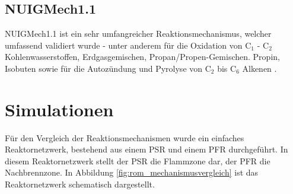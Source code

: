 \documentclass[footmark=none]{tubaf-thesis}
\begin{document}
    \subsection*{NUIGMech1.1}
        NUIGMech1.1 ist ein sehr umfangreicher Reaktionsmechanismus, welcher umfassend validiert wurde - unter anderem für die Oxidation von C$_1$ - C$_2$ Kohlenwasserstoffen, Erdgasgemischen, Propan/Propen-Gemischen. Propin, Isobuten sowie für die Autozündung und Pyrolyse von C$_2$ bis C$_6$ Alkenen \cite{MARTINEZ2021401}.
    \section{Simulationen}
        Für den Vergleich der Reaktionsmechanismen wurde ein einfaches Reaktornetzwerk, bestehend aus einem PSR und einem PFR durchgeführt. In diesem Reaktornetzwerk stellt der PSR die Flammzone dar, der PFR die Nachbrennzone. In Abbildung \ref{fig:rom_mechanismusvergleich} ist das Reaktornetzwerk schematisch dargestellt.\\
\end{document}
